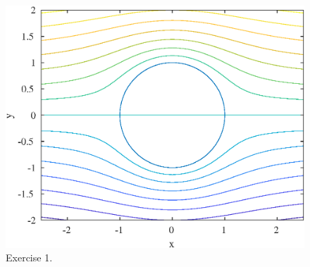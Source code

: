 
  
\begin{figure}[htbp]
\centering
\includegraphics[scale=0.80]{graphs/e4g1.eps}
\caption{Exercise 1.}
\label{e4g1}
\end{figure}